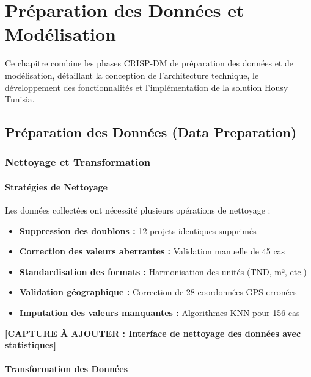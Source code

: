 \chapter{Préparation des Données et Modélisation}

\begin{objectivebox}
Ce chapitre combine les phases CRISP-DM de préparation des données et de modélisation, détaillant la conception de l'architecture technique, le développement des fonctionnalités et l'implémentation de la solution Housy Tunisia.
\end{objectivebox}

\section{Préparation des Données (Data Preparation)}

\subsection{Nettoyage et Transformation}

\subsubsection{Stratégies de Nettoyage}

Les données collectées ont nécessité plusieurs opérations de nettoyage :

\begin{itemize}
    \item \textbf{Suppression des doublons :} 12 projets identiques supprimés
    \item \textbf{Correction des valeurs aberrantes :} Validation manuelle de 45 cas
    \item \textbf{Standardisation des formats :} Harmonisation des unités (TND, m², etc.)
    \item \textbf{Validation géographique :} Correction de 28 coordonnées GPS erronées
    \item \textbf{Imputation des valeurs manquantes :} Algorithmes KNN pour 156 cas
\end{itemize}

\textbf{[CAPTURE À AJOUTER : Interface de nettoyage des données avec statistiques]}

\subsubsection{Transformation des Données}

